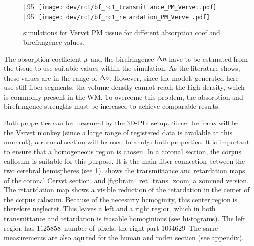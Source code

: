 % 
% 
% 
\begin{figure}[!tp]
\centering
{}[.95\textwidth]{
\texttt{[image: dev/rc1/bf\_rc1\_transmittance\_PM\_Vervet.pdf]}} %
{}[.95\textwidth]{
\texttt{[image: dev/rc1/bf\_rc1\_retardation\_PM\_Vervet.pdf]}
}
\caption{simulations for Vervet PM tissue for different absorption coef and birefringence values.}
\label{fig:parameterModelSim}
\end{figure}
% 
The absorption coefficient $\textnormal{$\mu$}{}$ and the birefringence $\textnormal{$\Delta n$}{}$ have to be estimated from the tissue to use suitable values within the simulation.
As the literature shows, these values are in the range of \dummy{}\TODO{!!!} $\textnormal{$\Delta n$}{}$.
However, since the models generated here use stiff fiber segments, the volume density cannot reach the high density, which is commonly present in the \ac{WM}.
To overcome this problem, the absorption and birefringence strengths must be increased to achieve comparable results.
\par
% 
Both properties can be measured by the \ac{3D-PLI} setup.
Since the focus will be the Vervet monkey (since a large range of registered data is available at this moment), a coronal section will be used to analys both properties.
It is important to ensure that a homogeneous region is chosen.
In a coronal section, the corpus callosum is suitable for this purpose. It is the main fiber connection between the two cerebral hemispheres (see \cref{fig:parameterModelSim}).
% 
% 
 shows the transmittance and retardation maps of the coronal Cervet section, and \ref{fig:brain_ret_trans_zoom} a zommed version.
The retartdation map shows a visible reduction of the retardation in the center of the corpus calosum.
Because of the necesarry homoginity, this center region is therefore neglectet.
This leaves a left and a right region, which in both transmittance and retardation is feasable homoginious (see histograms).
The left region has $\SI{1125858}{}$ number of pixels, the right part $\SI{1064629}{}$
% 
The same measurements are also aquired for the human and roden section (see appendix). 
% 
% 
% 
